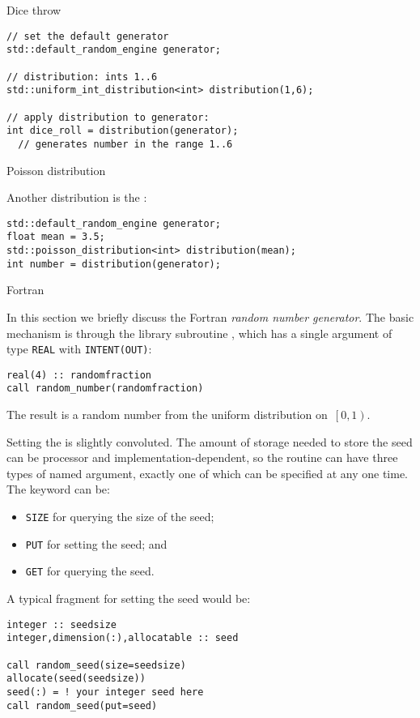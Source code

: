  {Dice throw}

\begin{lstlisting}
// set the default generator
std::default_random_engine generator;

// distribution: ints 1..6
std::uniform_int_distribution<int> distribution(1,6);

// apply distribution to generator:
int dice_roll = distribution(generator);
  // generates number in the range 1..6 
\end{lstlisting}

 {Poisson distribution}

  Another distribution is the :
\begin{lstlisting}
std::default_random_engine generator;
float mean = 3.5;
std::poisson_distribution<int> distribution(mean);
int number = distribution(generator);
\end{lstlisting}


 {Fortran}
\lstset{language=Fortran}

In this section we briefly discuss the Fortran \emph{random number generator}.
The basic mechanism is through the library subroutine
, which has a single argument of type
\lstinline{REAL} with \lstinline{INTENT(OUT)}:
\begin{lstlisting}
real(4) :: randomfraction
call random_number(randomfraction)
\end{lstlisting}
The result is a random number from the uniform distribution
on~$\left[0,1\right)$.
  
Setting the  is slightly convoluted. The
amount of storage needed to store the seed can be processor and
implementation-dependent, so the routine 
can have three types of named argument, exactly one of which can be
specified at any one time. The keyword can be:
\begin{itemize}
\item \lstinline{SIZE} for querying the size of the seed;
\item \lstinline{PUT} for setting the seed; and
\item \lstinline{GET} for querying the seed.
\end{itemize}
A typical fragment for setting the seed would be:
\begin{lstlisting}
integer :: seedsize
integer,dimension(:),allocatable :: seed

call random_seed(size=seedsize)
allocate(seed(seedsize))
seed(:) = ! your integer seed here
call random_seed(put=seed)
\end{lstlisting}

